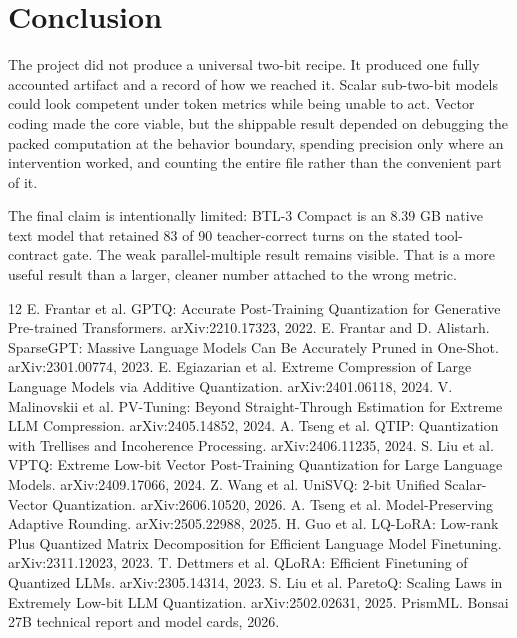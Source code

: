 \documentclass[10pt,twocolumn]{article}
\begin{document}
\section{Conclusion}

The project did not produce a universal two-bit recipe. It produced one fully accounted artifact and a record of how we reached it. Scalar sub-two-bit models could look competent under token metrics while being unable to act. Vector coding made the core viable, but the shippable result depended on debugging the packed computation at the behavior boundary, spending precision only where an intervention worked, and counting the entire file rather than the convenient part of it.

The final claim is intentionally limited: BTL-3 Compact is an 8.39 GB native text model that retained 83 of 90 teacher-correct turns on the stated tool-contract gate. The weak parallel-multiple result remains visible. That is a more useful result than a larger, cleaner number attached to the wrong metric.

\balance
\begin{thebibliography}{12}
 E. Frantar et al. GPTQ: Accurate Post-Training Quantization for Generative Pre-trained Transformers. arXiv:2210.17323, 2022.
 E. Frantar and D. Alistarh. SparseGPT: Massive Language Models Can Be Accurately Pruned in One-Shot. arXiv:2301.00774, 2023.
 E. Egiazarian et al. Extreme Compression of Large Language Models via Additive Quantization. arXiv:2401.06118, 2024.
 V. Malinovskii et al. PV-Tuning: Beyond Straight-Through Estimation for Extreme LLM Compression. arXiv:2405.14852, 2024.
 A. Tseng et al. QTIP: Quantization with Trellises and Incoherence Processing. arXiv:2406.11235, 2024.
 S. Liu et al. VPTQ: Extreme Low-bit Vector Post-Training Quantization for Large Language Models. arXiv:2409.17066, 2024.
 Z. Wang et al. UniSVQ: 2-bit Unified Scalar-Vector Quantization. arXiv:2606.10520, 2026.
 A. Tseng et al. Model-Preserving Adaptive Rounding. arXiv:2505.22988, 2025.
 H. Guo et al. LQ-LoRA: Low-rank Plus Quantized Matrix Decomposition for Efficient Language Model Finetuning. arXiv:2311.12023, 2023.
 T. Dettmers et al. QLoRA: Efficient Finetuning of Quantized LLMs. arXiv:2305.14314, 2023.
 S. Liu et al. ParetoQ: Scaling Laws in Extremely Low-bit LLM Quantization. arXiv:2502.02631, 2025.
 PrismML. Bonsai 27B technical report and model cards, 2026.
\end{thebibliography}
\end{document}
